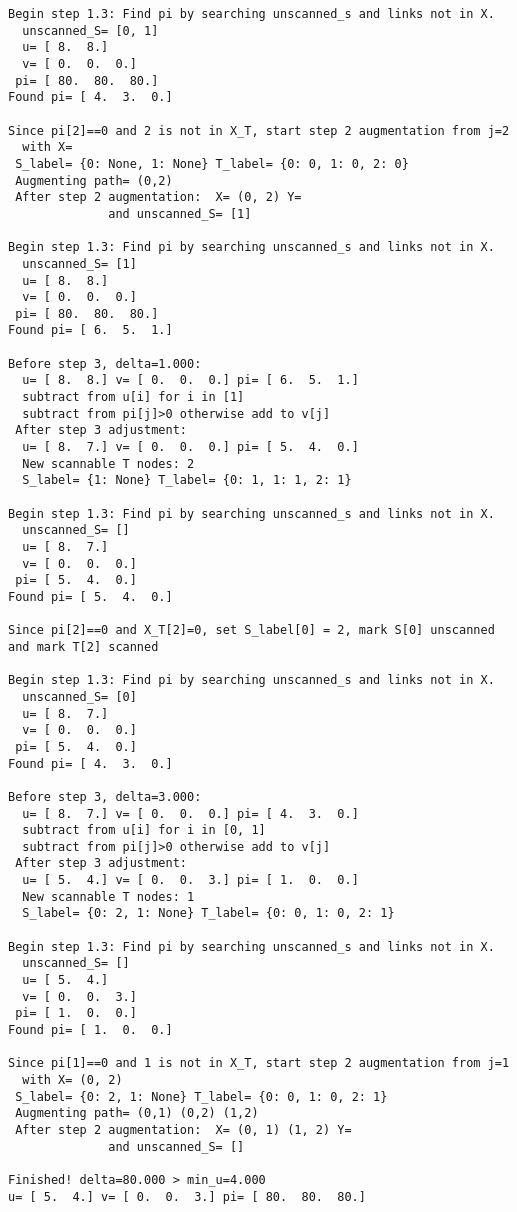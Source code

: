 \documentclass[12pt]{article}
\begin{document}
\begin{verbatim}
Begin step 1.3: Find pi by searching unscanned_s and links not in X.
  unscanned_S= [0, 1]
  u= [ 8.  8.]
  v= [ 0.  0.  0.]
 pi= [ 80.  80.  80.]
Found pi= [ 4.  3.  0.]

Since pi[2]==0 and 2 is not in X_T, start step 2 augmentation from j=2
  with X= 
 S_label= {0: None, 1: None} T_label= {0: 0, 1: 0, 2: 0}
 Augmenting path= (0,2) 
 After step 2 augmentation:  X= (0, 2) Y= 
              and unscanned_S= [1]

Begin step 1.3: Find pi by searching unscanned_s and links not in X.
  unscanned_S= [1]
  u= [ 8.  8.]
  v= [ 0.  0.  0.]
 pi= [ 80.  80.  80.]
Found pi= [ 6.  5.  1.]

Before step 3, delta=1.000:
  u= [ 8.  8.] v= [ 0.  0.  0.] pi= [ 6.  5.  1.]
  subtract from u[i] for i in [1]
  subtract from pi[j]>0 otherwise add to v[j]
 After step 3 adjustment:
  u= [ 8.  7.] v= [ 0.  0.  0.] pi= [ 5.  4.  0.]
  New scannable T nodes: 2 
  S_label= {1: None} T_label= {0: 1, 1: 1, 2: 1}

Begin step 1.3: Find pi by searching unscanned_s and links not in X.
  unscanned_S= []
  u= [ 8.  7.]
  v= [ 0.  0.  0.]
 pi= [ 5.  4.  0.]
Found pi= [ 5.  4.  0.]

Since pi[2]==0 and X_T[2]=0, set S_label[0] = 2, mark S[0] unscanned
and mark T[2] scanned

Begin step 1.3: Find pi by searching unscanned_s and links not in X.
  unscanned_S= [0]
  u= [ 8.  7.]
  v= [ 0.  0.  0.]
 pi= [ 5.  4.  0.]
Found pi= [ 4.  3.  0.]

Before step 3, delta=3.000:
  u= [ 8.  7.] v= [ 0.  0.  0.] pi= [ 4.  3.  0.]
  subtract from u[i] for i in [0, 1]
  subtract from pi[j]>0 otherwise add to v[j]
 After step 3 adjustment:
  u= [ 5.  4.] v= [ 0.  0.  3.] pi= [ 1.  0.  0.]
  New scannable T nodes: 1 
  S_label= {0: 2, 1: None} T_label= {0: 0, 1: 0, 2: 1}

Begin step 1.3: Find pi by searching unscanned_s and links not in X.
  unscanned_S= []
  u= [ 5.  4.]
  v= [ 0.  0.  3.]
 pi= [ 1.  0.  0.]
Found pi= [ 1.  0.  0.]

Since pi[1]==0 and 1 is not in X_T, start step 2 augmentation from j=1
  with X= (0, 2) 
 S_label= {0: 2, 1: None} T_label= {0: 0, 1: 0, 2: 1}
 Augmenting path= (0,1) (0,2) (1,2) 
 After step 2 augmentation:  X= (0, 1) (1, 2) Y= 
              and unscanned_S= []

Finished! delta=80.000 > min_u=4.000
u= [ 5.  4.] v= [ 0.  0.  3.] pi= [ 80.  80.  80.]
\end{verbatim}
\end{document}
